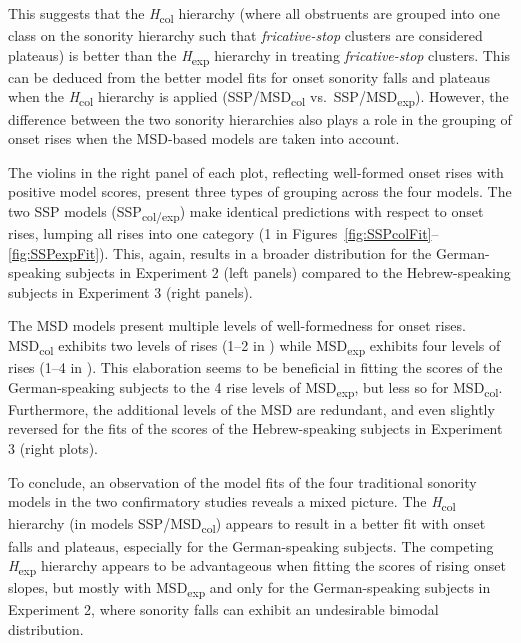 This suggests that the \emph{H}\textsubscript{col} hierarchy (where all obstruents are grouped into one class on the sonority hierarchy such that \emph{fricative-stop} clusters are considered plateaus) is better than the \emph{H}\textsubscript{exp} hierarchy in treating \emph{fricative-stop} clusters.
This can be deduced from
the better model fits for onset sonority falls and plateaus when the \emph{H}\textsubscript{col} hierarchy is applied (SSP/MSD\textsubscript{col} vs.~SSP/MSD\textsubscript{exp}). However, the difference between the two sonority hierarchies also plays a role in the grouping of onset rises when the MSD-based models are taken into account.

The violins in the right panel of each plot, reflecting well-formed onset rises with positive model scores, present three types of grouping across the four models. The two SSP models (SSP\textsubscript{col/exp}) make identical predictions with respect to onset rises, lumping all rises into one category (1 in Figures~\ref{fig:SSPcolFit}--\ref{fig:SSPexpFit}).
This, again, results in a broader distribution for the German-speaking subjects in Experiment 2 (left panels) compared to the Hebrew-speaking subjects in Experiment 3 (right panels).

The MSD models present multiple levels of well-formedness for onset rises. MSD\textsubscript{col} exhibits two levels of rises (1--2 in ) while MSD\textsubscript{exp} exhibits four levels of rises (1--4 in ).
This elaboration seems to be beneficial in fitting the scores of the German-speaking subjects to the 4 rise levels of MSD\textsubscript{exp}, but less so for MSD\textsubscript{col}. Furthermore, the additional levels of the MSD are redundant, and even slightly reversed for the fits of the scores of the Hebrew-speaking subjects in Experiment 3 (right plots).

To conclude, an observation of the model fits of the four traditional sonority models in the two confirmatory studies reveals a mixed picture. The \emph{H}\textsubscript{col} hierarchy (in models SSP/MSD\textsubscript{col}) appears to result in a better fit with onset falls and plateaus, especially for the German-speaking subjects.
The competing \emph{H}\textsubscript{exp} hierarchy appears to be advantageous when fitting the scores of rising onset slopes, but mostly with MSD\textsubscript{exp} and only for the German-speaking subjects in Experiment 2, where sonority falls can exhibit an undesirable bimodal distribution.

